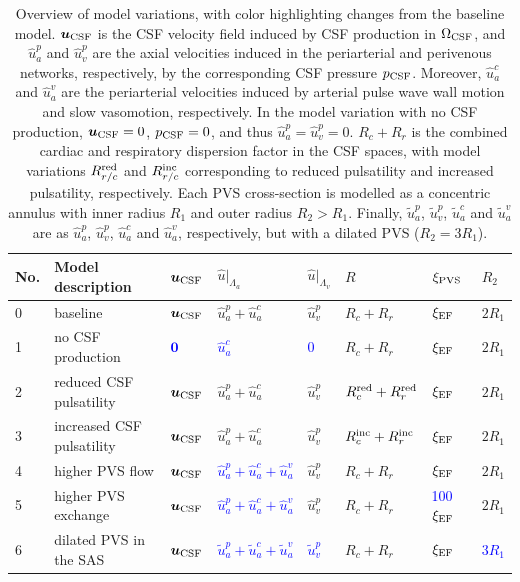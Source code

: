 \documentclass[fleqn,10pt]{wlscirep}
\begin{document}
\newcommand{\blue}[1]{\textcolor{blue}{#1}}
\begin{table}
  \begin{center}
  \begin{tabular}{ll|lll|lll}
    \toprule
    No. & Model description & $\bm u_{\rm CSF}$ & $\hat{u}|_{\Lambda_a}$ & $\hat{u}|_{\Lambda_v}$ & $R$ & $\xi_{\rm PVS}$ & $R_2$ \\
    \midrule
    0 & baseline & $\bm u_{\rm CSF}$ & $\hat{u}_a^p + \hat{u}_a^c$ & $\hat{u}_v^p$                & $R_c + R_r$ & $\xi_{\rm EF}$ & $2 R_1$   \\ 
    1 & no CSF production & \blue{$\bm 0$} & \blue{$\hat{u}_a^c$} & \blue{0}                    & $R_c + R_r$ & $\xi_{\rm EF}$ & $2 R_1$   \\ 
    2 & reduced CSF pulsatility & $\bm u_{\rm CSF}$ & $\hat{u}_a^p + \hat{u}_a^c$ & $\hat{u}_v^p$  & \blue{$ R_c^{\rm red} + R_r^{\rm red}$} & $\xi_{\rm EF}$ & $2 R_1$  \\ 
    3 & increased CSF pulsatility & $\bm u_{\rm CSF}$ & $\hat{u}_a^p + \hat{u}_a^c$ & $\hat{u}_v^p$  & \blue{$ R_c^{\rm inc} + R_r^{\rm inc}$} & $\xi_{\rm EF}$ & $2 R_1$  \\ 
    4 & higher PVS flow & $\bm u_{\rm CSF}$ & \blue{$\hat{u}_a^p + \hat{u}_a^c + \hat{u}_a^v$} & $\hat{u}_v^p$  & $R_c + R_r$ & $\xi_{\rm EF}$ & $2 R_1$  \\ 
    5 & higher PVS exchange & $\bm u_{\rm CSF}$ & \blue{$\hat{u}_a^p + \hat{u}_a^c + \hat{u}_a^v$} & $\hat{u}_v^p$ & $R_c + R_r$ & \blue{100 $\xi_{\rm EF}$} & $2 R_1$   \\ 
    6 & dilated PVS in the SAS & $\bm u_{\rm CSF}$ & \blue{$\tilde{u}_a^p + \tilde{u}_a^c + \tilde{u}_a^v$} & \blue{$\tilde{u}_v^p$} & $R_c + R_r$ & $\xi_{\rm EF}$ & \blue{$3 R_1$}\\ 
    \bottomrule
    \end{tabular}
    \end{center}
  \caption{Overview of model variations, with color highlighting
    changes from the baseline model. $\bm u_{\rm CSF}$ is the CSF
    velocity field induced by CSF production in $\Omega_{\rm CSF}$,
    and $\hat{u}_a^p$ and $\hat{u}_v^p$ are the axial velocities
    induced in the periarterial and perivenous networks, respectively,
    by the corresponding CSF pressure $p_{\rm CSF}$. Moreover,
    $\hat{u}_a^c$ and $\hat{u}_a^v$ are the periarterial velocities
    induced by arterial pulse wave wall motion and slow vasomotion,
    respectively. In the model variation with no CSF production, $\bm
    u_{\rm CSF} = 0$, $p_{\rm CSF} = 0$, and thus $\hat{u}_a^p =
    \hat{u}_v^p = 0$. $R_c + R_r$ is the combined cardiac and
    respiratory dispersion factor in the CSF spaces, with model
    variations $R_{r/c}^{\rm red}$ and $R_{r/c}^{\rm inc}$ corresponding to
    reduced pulsatility and increased pulsatility, respectively.  Each
    PVS cross-section is modelled as a concentric annulus with inner
    radius $R_1$ and outer radius $R_2 > R_1$. Finally,
    $\tilde{u}_a^p$, $\tilde{u}_v^p$, $\tilde{u}_a^c$ and
    $\tilde{u}_a^v$ are as $\hat{u}_a^p$, $\hat{u}_v^p$, $\hat{u}_a^c$
    and $\hat{u}_a^v$, respectively, but with a dilated PVS ($R_2 = 3
    R_1$).}
\label{tab:scenarios}
\end{table}
\end{document}
